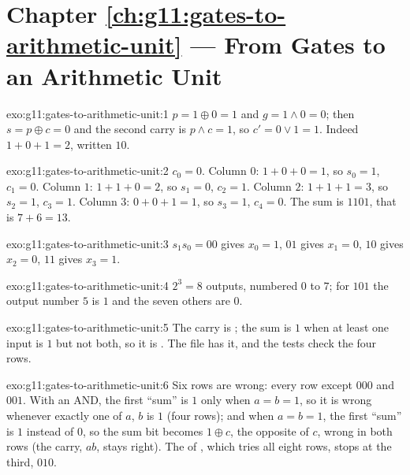 \section*{Chapter \ref{ch:g11:gates-to-arithmetic-unit} --- From Gates to an Arithmetic Unit}

\begin{solution}{exo:g11:gates-to-arithmetic-unit:1}
$p = 1 \oplus 0 = 1$ and $g = 1 \wedge 0 = 0$; then $s = p \oplus c = 0$ and the second carry is $p \wedge c = 1$, so
$c' = 0 \vee 1 = 1$. Indeed $1 + 0 + 1 = 2$, written $10$.
\end{solution}

\begin{solution}{exo:g11:gates-to-arithmetic-unit:2}
$c_0 = 0$. Column $0$: $1 + 0 + 0 = 1$, so $s_0 = 1$, $c_1 = 0$. Column $1$: $1 + 1 + 0 = 2$, so $s_1 = 0$,
$c_2 = 1$. Column $2$: $1 + 1 + 1 = 3$, so $s_2 = 1$, $c_3 = 1$. Column $3$: $0 + 0 + 1 = 1$, so $s_3 = 1$,
$c_4 = 0$. The sum is $1101$, that is $7 + 6 = 13$.
\end{solution}

\begin{solution}{exo:g11:gates-to-arithmetic-unit:3}
$s_1 s_0 = 00$ gives $x_0 = 1$, $01$ gives $x_1 = 0$, $10$ gives $x_2 = 0$, $11$ gives $x_3 = 1$.
\end{solution}

\begin{solution}{exo:g11:gates-to-arithmetic-unit:4}
$2^3 = 8$ outputs, numbered $0$ to $7$; for $101$ the output number $5$ is $1$ and the seven others are $0$.
\end{solution}

\begin{solution}{exo:g11:gates-to-arithmetic-unit:5}
The carry is ; the sum is $1$ when at least one input is $1$ but not both, so it is
. The file  has it, and the tests check the four
rows.
\end{solution}

\begin{solution}{exo:g11:gates-to-arithmetic-unit:6}
Six rows are wrong: every row except $000$ and $001$. With an AND, the first ``sum'' is $1$ only when $a = b = 1$,
so it is wrong whenever exactly one of $a$, $b$ is $1$ (four rows); and when $a = b = 1$, the first ``sum'' is $1$
instead of $0$, so the sum bit becomes $1 \oplus c$, the opposite of $c$, wrong in both rows (the carry, $ab$, stays right). The  of
, which tries all eight rows, stops at the third, $010$.
\end{solution}

